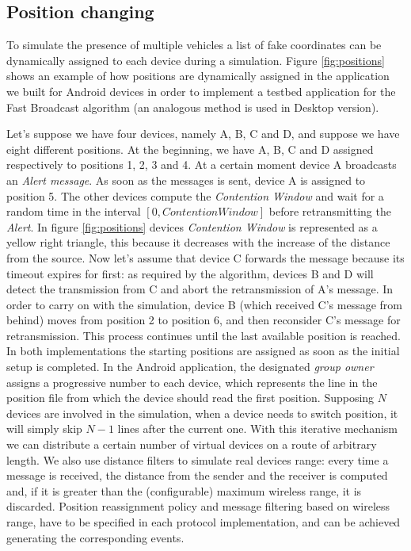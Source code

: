 \subsection{Position changing}
\label{sec:position_change}

To simulate the presence of multiple vehicles a list of fake coordinates can be dynamically assigned to each device during a simulation. Figure \ref{fig:positions} shows an example of how positions are dynamically assigned in the application we built for Android devices in order to implement a testbed application for the Fast Broadcast algorithm (an analogous method is used in Desktop version).

Let's suppose we have four devices, namely A, B, C and D, and suppose we have eight different positions. At the beginning, we have A, B, C and D assigned respectively to positions 1, 2, 3 and 4. At a certain moment device A broadcasts an \emph{Alert message}. As soon as the messages is sent, device A is assigned to position 5. The other devices compute the \textit{Contention Window} and wait for a random time in the interval $[0,Contention Window]$ before retransmitting the \emph{Alert}. In figure \ref{fig:positions} devices \textit{Contention Window} is represented as a yellow right triangle, this because it decreases with the increase of the distance from the source. Now let's assume that device C forwards the message because its timeout expires for first: as required by the algorithm, devices B and D will detect the transmission from C and abort the retransmission of A's message. In order to carry on with the simulation, device B (which received C's message from behind) moves from position 2 to position 6, and then reconsider C's message for retransmission. This process continues until the last available position is reached.
In both implementations the starting positions are assigned as soon as the initial setup is completed. In the Android application, the designated \textit{group owner} assigns a progressive number to each device, which represents the line in the position file from which the device should read the first position. Supposing $N$ devices are involved in the simulation, when a device needs to switch position, it will simply skip $N-1$ lines after the current one.
With this iterative mechanism we can distribute a certain number of virtual devices on a route of arbitrary length. 
We also use distance filters to simulate real devices range: every time a message is received, the distance from the sender and the receiver is computed and, if it is greater than the (configurable) maximum wireless range, it is discarded.
Position reassignment policy and message filtering based on wireless range, have to be specified in each protocol implementation, and can be achieved generating the corresponding events.

